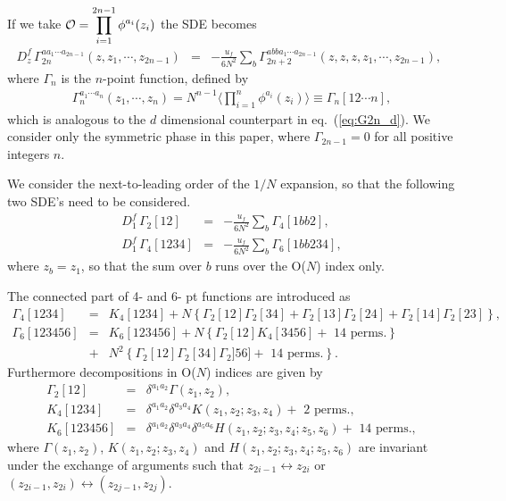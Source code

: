 \documentclass[preprint]{ptephy_v1}%
\begin{document}
 
If we take ${\cal O} =\displaystyle\prod_{i=1}^{2n-1} \phi^{a_i}(z_i)$ the SDE becomes 
\begin{eqnarray}
D_z^f \, \Gamma_{2n}^{aa_1\cdots a_{2n-1}}(z,z_1,\cdots,z_{2n-1}) &=&
-\frac{u_f}{6 N^2}\sum_b \Gamma_{2n+2}^{abba_1\cdots a_{2n-1}}(z,z,z,z_1,\cdots,z_{2n-1}),~~
\end{eqnarray}
where $\Gamma_n$ is the $n$-point function, defined by
\begin{eqnarray}
\Gamma_n^{a_1\cdots a_n}(z_1,\cdots,z_n) = N^{n-1}\langle \prod_{i=1}^n \phi^{a_i}(z_i)\rangle 
\equiv \Gamma_n[12\cdots n] ,
\end{eqnarray}
which is analogous to the $d$  dimensional  counterpart in eq.~(\ref{eq:G2n_d}).
We consider only the symmetric phase in this paper, where $\Gamma_{2n-1} = 0$ for all positive integers $n$. 

We consider the next-to-leading order of the $1/N$ expansion, so that the following two SDE's need to be considered.
\begin{eqnarray}
D_1^f\, \Gamma_2[12] &=& -\frac{u_f}{6N^2} \sum_b \Gamma_4[1bb2], \\
D_1^f\, \Gamma_4[1234] &=& 
-\frac{u_f}{6N^2} \sum_b \Gamma_6[1bb234],  
\end{eqnarray}
where $z_b=z_1$, so that  the sum over $b$ runs over the O($N$) index only.

The connected part of  4- and 6- pt functions are introduced as 
\begin{eqnarray}
\Gamma_4[1234] &=& K_4[1234] + N\left\{\Gamma_2[12] \Gamma_2[34] + \Gamma_2[13] \Gamma_2[24] + \Gamma_2[14] \Gamma_2[23]\right\}, \\
\Gamma_6[123456] &=& K_6[123456] + N\left\{\Gamma_2[12] K_4[3456] + \mbox{ 14 perms.} \right\} \nonumber \\
&+& N^2\left\{\Gamma_2[12] \Gamma_2[34]\Gamma_2]56] + \mbox{ 14 perms.} \right\} .
\end{eqnarray}
Furthermore  decompositions in O($N$) indices are given by
\begin{eqnarray}
\Gamma_2[12] &=& \delta^{a_1a_2}\Gamma(z_1,z_2), \\
K_4[1234] &=& \delta^{a_1a_2}\delta^{a_3a_4} K(z_1,z_2;z_3,z_4) +\mbox{ 2 perms.}, \\
K_6[123456] &=& \delta^{a_1a_2}\delta^{a_3a_4}\delta^{a_5a_6} H(z_1,z_2;z_3,z_4;z_5,z_6) +
\mbox{ 14 perms.} ,
\end{eqnarray}
where $\Gamma(z_1,z_2)$, $K(z_1,z_2;z_3,z_4)$ and $H(z_1,z_2;z_3,z_4;z_5,z_6)$ are invariant under the exchange of arguments such that $z_{2i-1}\leftrightarrow z_{2i}$ or $(z_{2i-1},z_{2i}) \leftrightarrow (z_{2j-1},z_{2j})$. 
\end{document}
